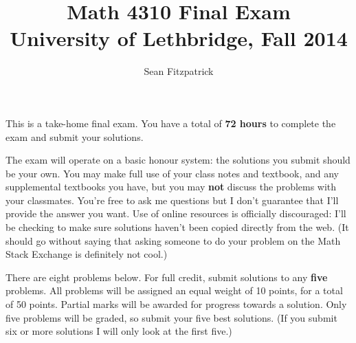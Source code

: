 \documentclass[letterpaper,12pt]{article}
\title{Math 4310 Final Exam\\University of Lethbridge, Fall 2014}
\author{Sean Fitzpatrick}
\begin{document}
 \maketitle

This is a take-home final exam. You have a total of {\bf 72 hours} to complete the exam and submit your solutions. 

The exam will operate on a basic honour system: the solutions you submit should be your own. You may make full use of your class notes and textbook, and any supplemental textbooks you have, but you may {\bf not} discuss the problems with your classmates. You're free to ask me questions but I don't guarantee that I'll provide the answer you want. Use of online resources is officially discouraged: I'll be checking to make sure solutions haven't been copied directly from the web. (It should go without saying that asking someone to do your problem on the Math Stack Exchange is definitely not cool.)

\bigskip

There are eight problems below. For full credit, submit solutions to any {\bf five} problems. All problems will be assigned an equal weight of 10 points, for a total of 50 points. Partial marks will be awarded for progress towards a solution. Only five problems will be graded, so submit your five best solutions. (If you submit six or more solutions I will only look at the first five.)
\end{document}

